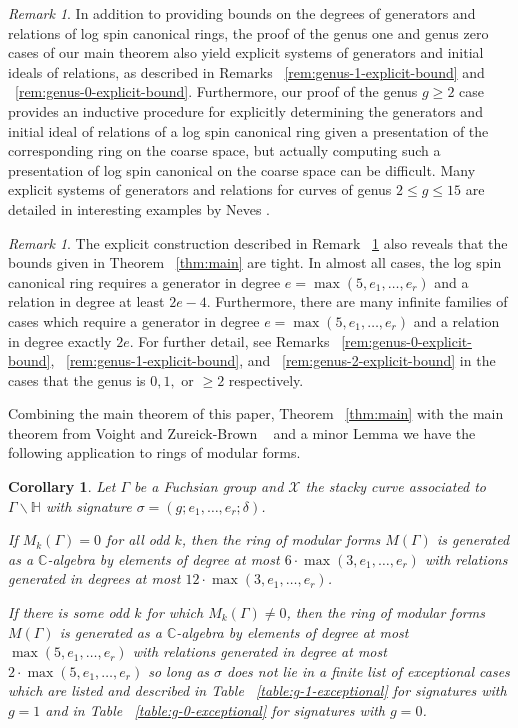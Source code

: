 \documentclass{amsart}
\theoremstyle{plain}
\newtheorem{cor}[thm]{Corollary}
\theoremstyle{definition}
\theoremstyle{remark}
\newtheorem{rem}[thm]{Remark}
\numberwithin{equation}{section}
\newcommand\BH{{\mathbb H}}
\newcommand\BC{{\mathbb C}}
\newcommand\sx{\mathscr X}
\begin{document}
\begin{rem}
\label{rem:explicit-generators}
In addition to providing bounds on the degrees of generators and relations of log spin canonical rings, the proof
of the genus one and genus zero cases of our main theorem also yield explicit systems
of generators and initial ideals of relations, as described in Remarks ~\ref{rem:genus-1-explicit-bound} and ~\ref{rem:genus-0-explicit-bound}.
Furthermore, our proof of the genus $g \geq 2$ case provides
an inductive procedure for explicitly determining the generators
and initial ideal of relations of a log spin canonical ring given a presentation of the corresponding ring on the coarse space, but actually computing such a presentation of log spin canonical on the coarse space can be difficult.  Many
explicit systems of generators and relations for curves of genus $2
\leq g \leq 15$ are detailed in interesting examples by Neves
\cite[Section III.4]{neves:halfcan}. 
\end{rem}

\begin{rem}
The explicit construction described in Remark ~\ref{rem:explicit-generators} also reveals that the bounds given in Theorem ~\ref{thm:main} are tight.
In almost all cases, the log spin canonical ring requires a generator in degree $e = \max(5, e_1, \ldots, e_r)$ and a relation in degree at least $2e-4$. 
Furthermore, there are many infinite families of cases which require a generator in degree $e = \max(5, e_1, \ldots, e_r)$ and a relation in degree exactly $2e$. For further detail, see Remarks ~\ref{rem:genus-0-explicit-bound}, ~\ref{rem:genus-1-explicit-bound}, and ~\ref{rem:genus-2-explicit-bound} in the cases that the genus is $0,1,$ or $\geq 2$ respectively.
\end{rem}

Combining the main theorem of this paper, Theorem ~\ref{thm:main} with the main theorem from Voight and Zureick-Brown ~\cite
[Theorem 1.4]{vzb:stacky} and a minor Lemma \cite[Lemma 10.2.1]{vzb:stacky}
we have the following application to
rings of modular forms.

\begin{cor}
\label{cor:main-mod-forms}
Let $\Gamma$ be a Fuchsian group and $\sx$ the stacky curve
associated to $\Gamma \backslash \BH$ with signature $\sigma
= (g; e_1, \ldots, e_r; \delta)$. 

If $M_k(\Gamma) = 0$ for all odd $k$, then the ring of modular
forms $M(\Gamma)$ is generated as a $\BC$-algebra by elements of
degree at most $6 \cdot \max(3, e_1, \ldots, e_r)$ with relations
generated in degrees at most $12 \cdot \max(3, e_1, \ldots, e_r)$.

If there is some odd $k$ for which $M_k(\Gamma) \neq 0$, then the
ring of modular forms $M(\Gamma)$ is generated as a $\BC$-algebra
by elements of degree at most $\max(5, e_1, \ldots, e_r)$ with
relations generated in degree at most $2 \cdot \max(5, e_1, \ldots, 
e_r)$ so long as $\sigma$ does not lie in a finite list of
exceptional cases which are listed and described in Table
~\ref{table:g-1-exceptional} for signatures with $g = 1$ and in
Table ~\ref{table:g-0-exceptional} for signatures with $g = 0$.
\end{cor}
\end{document}
